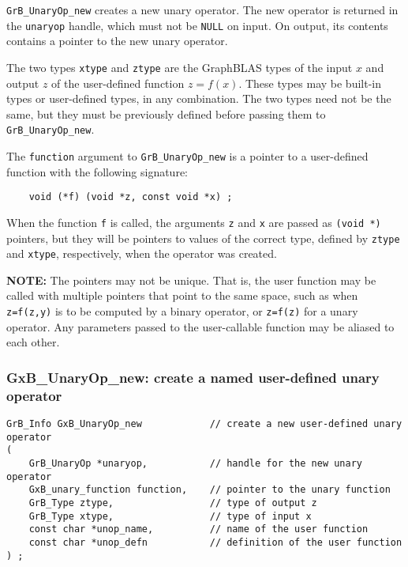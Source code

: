 \documentclass[12pt]{article}
\begin{document}
\verb'GrB_UnaryOp_new' creates a new unary operator.  The new operator is
returned in the \verb'unaryop' handle, which must not be \verb'NULL' on input.
On output, its contents contains a pointer to the new unary operator.

The two types \verb'xtype' and \verb'ztype' are the GraphBLAS types of the
input $x$ and output $z$ of the user-defined function $z=f(x)$.  These types
may be built-in types or user-defined types, in any combination.  The two types
need not be the same, but they must be previously defined before passing them
to \verb'GrB_UnaryOp_new'.

The \verb'function' argument to \verb'GrB_UnaryOp_new' is a pointer to a
user-defined function with the following signature:

    {\footnotesize
    \begin{verbatim}
    void (*f) (void *z, const void *x) ; \end{verbatim} }

When the function \verb'f' is called, the arguments \verb'z' and \verb'x' are
passed as \verb'(void *)' pointers, but they will be pointers to values of the
correct type, defined by \verb'ztype' and \verb'xtype', respectively, when the
operator was created.

{\bf NOTE:}
The pointers may not be unique.  That is, the user function may be
called with multiple pointers that point to the same space, such as when
\verb'z=f(z,y)' is to be computed by a binary operator, or \verb'z=f(z)' for a
unary operator.  Any parameters passed to the user-callable function may be
aliased to each other.

\newpage
\subsubsection{{\sf GxB\_UnaryOp\_new:} create a named user-defined unary operator}
\label{unaryop_new_named}

\begin{mdframed}[userdefinedwidth=6in]
{\footnotesize
\begin{verbatim}
GrB_Info GxB_UnaryOp_new            // create a new user-defined unary operator
(
    GrB_UnaryOp *unaryop,           // handle for the new unary operator
    GxB_unary_function function,    // pointer to the unary function
    GrB_Type ztype,                 // type of output z
    GrB_Type xtype,                 // type of input x
    const char *unop_name,          // name of the user function
    const char *unop_defn           // definition of the user function
) ;
\end{verbatim} }\end{mdframed}
\end{document}
